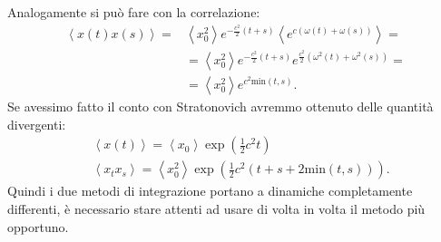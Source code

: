 \begin{exmp}[]
    Analogamente si può fare con la correlazione:
    \[\begin{aligned}
	\left<x(t) x(s)\right> = & \left<x_0^2\right>e^{-\frac{c^2}{2}\left(t+s\right)} \left<e^{c(\omega (t) + \omega (s) )}\right> = \\
				 & =\left<x_0^2\right>e^{-\frac{c^2}{2}\left(t+s\right)} e^{\frac{c^2}{2}(\omega^2(t) +\omega^2(s))} =\\
				 & = \left<x_0^2\right>e^{c^2\text{min}(t,s)}
    .\end{aligned}\]
    Se avessimo fatto il conto con Stratonovich avremmo ottenuto delle quantità divergenti:
    \[\begin{aligned}
	&\left<x(t) \right> = \left<x_0\right>\exp\left(\frac{1}{2}c^2t\right)\\
	&\left<x_tx_s\right> = \left<x_0^2\right>\exp\left(\frac{1}{2}c^2\left(t+s+2\text{min}(t,s) \right)\right)
    .\end{aligned}\]
    Quindi i due metodi di integrazione portano a dinamiche completamente differenti, è necessario stare attenti ad usare di volta in volta il metodo più opportuno.
\end{exmp}

